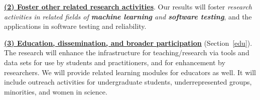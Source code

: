 \noindent\underline{{\bf (2) Foster other related research
    activities}}. Our results will foster {\em research activities in
  related fields of {\bf machine learning} and {\bf software testing}},
and the applications in software testing and reliability.



\noindent\underline{{\bf (3) Education, dissemination, and broader participation}} (Section~\ref{edu}). The
research will enhance the infrastructure for teaching/research via
tools and data sets for use by students and practitioners, and for
enhancement by researchers. We will provide related learning
modules for educators as well. It will include outreach activities for
undergraduate students, underrepresented groups, minorities, and women
in science.


